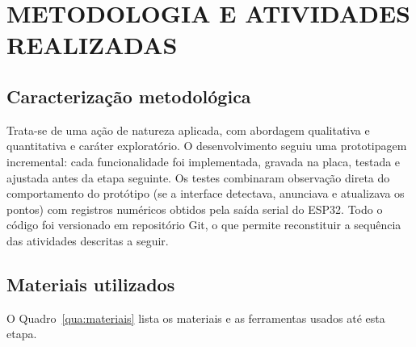 \chapter{METODOLOGIA E ATIVIDADES REALIZADAS}
\label{cap:atividades}

\section{Caracterização metodológica}
\label{sec:metodo}

Trata-se de uma ação de natureza aplicada, com abordagem qualitativa e quantitativa e caráter exploratório. O desenvolvimento seguiu uma prototipagem incremental: cada funcionalidade foi implementada, gravada na placa, testada e ajustada antes da etapa seguinte. Os testes combinaram observação direta do comportamento do protótipo (se a interface detectava, anunciava e atualizava os pontos) com registros numéricos obtidos pela saída serial do ESP32. Todo o código foi versionado em repositório Git, o que permite reconstituir a sequência das atividades descritas a seguir.

\section{Materiais utilizados}
\label{sec:materiais}

O Quadro~\ref{qua:materiais} lista os materiais e as ferramentas usados até esta etapa.

